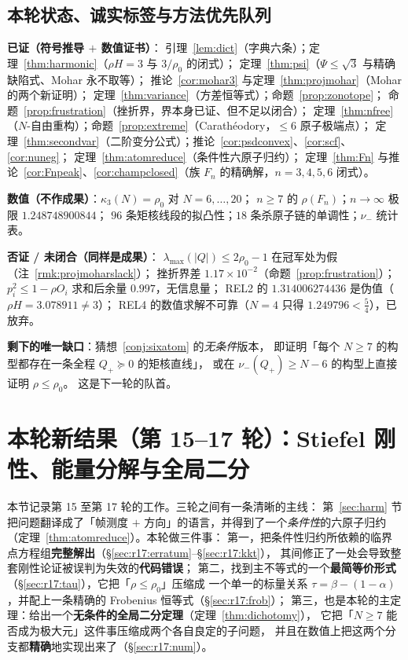 \documentclass[UTF8,11pt]{ctexart}
\theoremstyle{definition}
\begin{document}
\subsection{本轮状态、诚实标签与方法优先队列}\label{sec:harm:status}

\textbf{已证（符号推导 $+$ 数值证书）}：
引理~\ref{lem:dict}（字典六条）；定理~\ref{thm:harmonic}（$\rho H=3$ 与 $3/\rho_0$ 的闭式）；
定理~\ref{thm:psi}（$\Psi\le\sqrt3$ 与精确缺陷式、Mohar 永不取等）；
推论~\ref{cor:mohar3} 与定理~\ref{thm:projmohar}（Mohar 的两个新证明）；
定理~\ref{thm:variance}（方差恒等式）；命题~\ref{prop:zonotope}；
命题~\ref{prop:frustration}（挫折界，界本身已证、但不足以闭合）；
定理~\ref{thm:nfree}（$N$-自由重构）；命题~\ref{prop:extreme}（Carathéodory，$\le6$ 原子极端点）；
定理~\ref{thm:secondvar}（二阶变分公式）；推论~\ref{cor:psdconvex}、\ref{cor:scf}、\ref{cor:nuneg}；
定理~\ref{thm:atomreduce}（条件性六原子归约）；
定理~\ref{thm:Fn} 与推论~\ref{cor:Fnpeak}、\ref{cor:champclosed}（族 $F_n$ 的精确解，$n=3,4,5,6$ 闭式）。

\textbf{数值（不作成果）}：$\kappa_3(N)=\rho_0$ 对 $N=6,\dots,20$；
$n\ge7$ 的 $\rho(F_n)$；$n\to\infty$ 极限 $1.248748900844$；
$96$ 条矩核线段的拟凸性；$18$ 条杀原子链的单调性；$\nu_-$ 统计表。

\textbf{否证 / 未闭合（同样是成果）}：
$\lambda_{\max}(|Q|)\le2\rho_0-1$ 在冠军处为假（注~\ref{rmk:projmoharslack}）；
挫折界差 $1.17\times10^{-2}$（命题~\ref{prop:frustration}）；
$p_i^2\le1-\rho O_i$ 求和后余量 $0.997$，无信息量；
REL2 的 $1.314006274436$ 是伪值（$\rho H=3.078911\ne3$）；
REL4 的数值求解不可靠（$N=4$ 只得 $1.249796<\frac54$），已放弃。

\textbf{剩下的唯一缺口}：猜想~\ref{conj:sixatom} 的\emph{无条件}版本，
即证明「每个 $N\ge7$ 的构型都存在一条全程 $Q_+\succeq0$ 的矩核直线」，
或在 $\nu_-(Q_+)\ge N-6$ 的构型上直接证明 $\rho\le\rho_0$。
这是下一轮的队首。


\section{本轮新结果（第 15--17 轮）：Stiefel 刚性、能量分解与全局二分}\label{sec:r1517}

本节记录第 15 至第 17 轮的工作。三轮之间有一条清晰的主线：
第~\ref{sec:harm} 节把问题翻译成了「帧测度 $+$ 方向」的语言，并得到了一个\emph{条件性}的六原子归约
（定理~\ref{thm:atomreduce}）。本轮做三件事：
第一，把条件性归约所依赖的临界点方程组\textbf{完整解出}（\S\ref{sec:r17:erratum}--\S\ref{sec:r17:kkt}），
其间修正了一处会导致整套刚性论证被误判为失效的\textbf{代码错误}；
第二，找到主不等式的一个\textbf{最简等价形式}（\S\ref{sec:r17:tau}），它把「$\rho\le\rho_0$」压缩成
一个单一的标量关系 $\tau=\beta-(1-\alpha)$，并配上一条精确的 Frobenius 恒等式（\S\ref{sec:r17:frob}）；
第三，也是本轮的主定理：给出一个\textbf{无条件的全局二分定理}（定理~\ref{thm:dichotomy}），
它把「$N\ge7$ 能否成为极大元」这件事压缩成两个各自良定的子问题，
并且在数值上把这两个分支都\textbf{精确}地实现出来了（\S\ref{sec:r17:num}）。
\end{document}
